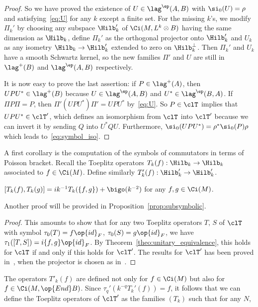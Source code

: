 \begin{proof}
So we have proved the existence of $U \in \lag^{\ep}(A,B)$ with $\si_0(U) = \rho$ and satisfying~\eqref{eq:U} for any $k$ except a finite set. For the missing $k$'s, we modify $\Pi_k'$ by choosing any subspace $\Hilb'_k$ of $\Ci (M, L^k \otimes B)$ having the same dimension as $\Hilb_k$, define $\Pi_k'$ as the orthogonal projector onto $\Hilb_k'$ and $U_k$ as any isometry $\Hilb_k \rightarrow \Hilb'_k$ extended to zero on $\Hilb_k^{\perp}$. Then $\Pi_k'$ and $U_k$ have a smooth Schwartz kernel, so the new families $\Pi '$ and $U$ are still in $\lag ^{+} (B)$ and $\lag ^{\ep} (A,B)$ respectively.

It is now easy to prove the last assertion: if $P \in \lag ^{+} (A)$, then $U P U^* \in \lag ^{+}(B)$ because $U \in \lag ^{\ep} (A,B)$ and $U^* \in
\lag^{\ep} (B,A)$. If $ \Pi P \Pi = P$, then $\Pi' (U P U^*) \Pi' = U P U^*$ by~\eqref{eq:U}. So $P \in \clT$ implies that $U P U^* \in
\clT'$, which defines an isomorphism from $\clT$ into $\clT'$ because we can invert it by sending $Q$ into $U^* Q U$. Furthermore, $\si_0 (UPU^*) = \rho^* \si_0 (P)
\rho$ which leads to~\eqref{eq:symbol_iso}.
\end{proof}

A first corollary is the computation of the symbols of commutators in terms of Poisson bracket. Recall the Toeplitz operators $T_k (f) : \Hilb_k
\rightarrow \Hilb_k$ associated to $f \in \Ci (M)$. Define similarly $T'_k (f) : \Hilb'_k \rightarrow \Hilb_k'$.

\begin{coro}
$ [T_k (f), T_k (g)] = i k^{-1} T_k (\{ f,g \}) + \bigo (k^{-2})$ for any $f, g \in \Ci (M)$.
\end{coro}
Another proof will be provided in Proposition~\ref{prop:subsymbolic}.

\begin{proof}
This amounts to show that for any two Toeplitz operators $T$, $S$ of
$\clT$ with symbol $\tau_0(T) = f \op{id}_F$, $\tau_0(S) = g
\op{id}_F$, we have $\tau_1 ([T,S]) = i \{ f, g\} \op{id}_F$. By Theorem~\ref{theo:unitary_equivalence}, this holds for $\clT$ if and only if this holds for $\clT'$.  The results for $\clT'$ has been proved in~\cite[Theorem~1.4]{oim}, when the projector is chosen as in~\cite[Theorem~1.1]{oim}.
\end{proof}

The operators $T'_k(f)$ are defined not only for $f \in \Ci (M)$ but also for $f \in \Ci (M, \op{End} B)$. Since $\tau_q'(k^{-q} T_k' (f)) = f$, it follows that we can define the Toeplitz operators of $\clT'$ as the families $(T_k)$ such that for any $N$,

